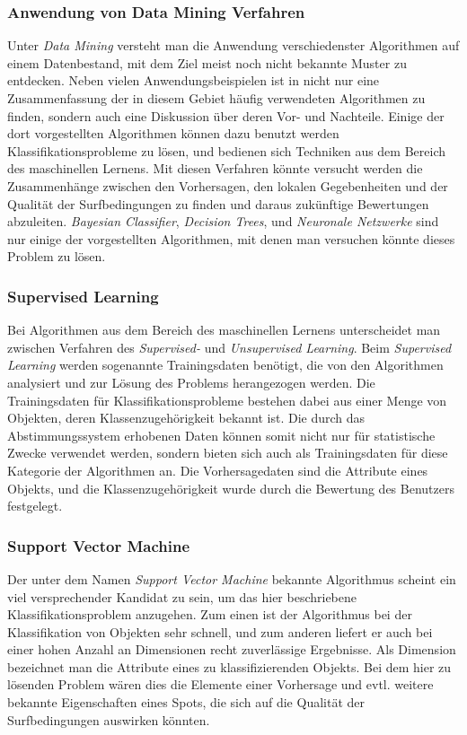 \subsubsection{Anwendung von Data Mining Verfahren}
Unter \textit{Data Mining} versteht man die Anwendung verschiedenster
Algorithmen auf einem Datenbestand, mit dem Ziel meist noch nicht
bekannte Muster zu entdecken. Neben vielen Anwendungsbeispielen ist in
\cite{Seagaran2007} nicht nur eine Zusammenfassung der in diesem
Gebiet häufig verwendeten Algorithmen zu finden, sondern auch eine
Diskussion über deren Vor- und Nachteile. Einige der dort
vorgestellten Algorithmen können dazu benutzt werden
Klassifikationsprobleme zu lösen, und bedienen sich Techniken aus dem
Bereich des maschinellen Lernens. Mit diesen Verfahren könnte versucht
werden die Zusammenhänge zwischen den Vorhersagen, den lokalen
Gegebenheiten und der Qualität der Surfbedingungen zu finden und
daraus zukünftige Bewertungen abzuleiten. \textit{Bayesian
  Classifier}, \textit{Decision Trees}, und \textit{Neuronale
  Netzwerke} sind nur einige der vorgestellten Algorithmen, mit denen
man versuchen könnte dieses Problem zu lösen.

\subsubsection{Supervised Learning}
Bei Algorithmen aus dem Bereich des maschinellen Lernens unterscheidet
man zwischen Verfahren des \textit{Supervised-} und
\textit{Unsupervised Learning}. Beim \textit{Supervised Learning}
werden sogenannte Trainingsdaten benötigt, die von den Algorithmen
analysiert und zur Lösung des Problems herangezogen werden. Die
Trainingsdaten für Klassifikationsprobleme bestehen dabei aus einer
Menge von Objekten, deren Klassenzugehörigkeit bekannt ist. Die durch
das Abstimmungssystem erhobenen Daten können somit nicht nur für
statistische Zwecke verwendet werden, sondern bieten sich auch als
Trainingsdaten für diese Kategorie der Algorithmen an. Die
Vorhersagedaten sind die Attribute eines Objekts, und die
Klassenzugehörigkeit wurde durch die Bewertung des Benutzers
festgelegt.

\subsubsection{Support Vector Machine}
Der unter dem Namen \textit{Support Vector Machine} bekannte
Algorithmus scheint ein viel versprechender Kandidat zu sein, um das
hier beschriebene Klassifikationsproblem anzugehen. Zum einen ist der
Algorithmus bei der Klassifikation von Objekten sehr schnell, und zum
anderen liefert er auch bei einer hohen Anzahl an Dimensionen recht
zuverlässige Ergebnisse. Als Dimension bezeichnet man die Attribute
eines zu klassifizierenden Objekts. Bei dem hier zu lösenden Problem
wären dies die Elemente einer Vorhersage und evtl. weitere bekannte
Eigenschaften eines Spots, die sich auf die Qualität der
Surfbedingungen auswirken könnten.

